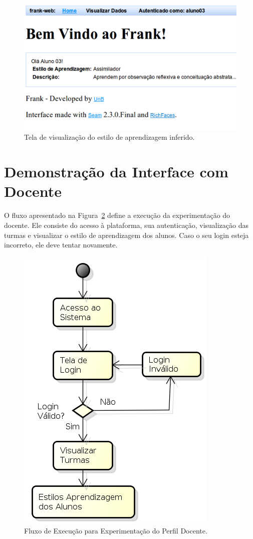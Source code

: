 \begin{figure}
	\centering
	\includegraphics[scale=0.6]{images/frank-tela-aluno-inferencia-estilo.png}
	\caption{Tela de visualização do estilo de aprendizagem inferido.}
	\label{fig:frank-tela-aluno-inferencia-estilo}
\end{figure}

\section{Demonstração da Interface com Docente}\label{section:interface-docente}
O fluxo apresentado na Figura~\ref{fig:fluxo-aluno} define a execução da experimentação do docente. Ele consiste do acesso à plataforma, sua autenticação, visualização das turmas e visualizar o estilo de aprendizagem dos alunos. Caso o seu login esteja incorreto, ele deve tentar novamente.

\begin{figure}
	\centering
	\includegraphics[scale=0.6]{images/fluxo-docente.png}
	\caption{Fluxo de Execução para Experimentação do Perfil Docente.}
	\label{fig:fluxo-aluno}
\end{figure}

